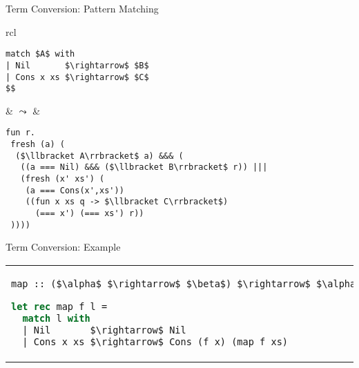 \documentclass{beamer}
\theoremstyle{definition}
\begin{document}
\begin{frame}[fragile]{Term Conversion: Pattern Matching}
  \begin{tabular}{rcl}
    \scalebox{3.5}{$\llbracket$}
    \begin{lstlisting}
match $A$ with
| Nil       $\rightarrow$ $B$
| Cons x xs $\rightarrow$ $C$
$$

    \end{lstlisting}
    \scalebox{3.5}{$\rrbracket$}
&
    $\leadsto$ & 
    \begin{lstlisting}
fun r.
 fresh (a) (
  ($\llbracket A\rrbracket$ a) &&& (
   ((a === Nil) &&& ($\llbracket B\rrbracket$ r)) ||| 
   (fresh (x' xs') (
    (a === Cons(x',xs'))
    ((fun x xs q -> $\llbracket C\rrbracket$) 
      (=== x') (=== xs') r))
 ))))
    \end{lstlisting}
    \end{tabular}
\end{frame}


\begin{comment}
\begin{frame}[fragile]\frametitle{Term Conversion: Pattern Matching}

    \begin{tabular}{l}
    \rule{0cm}{5mm}
    \begin{lstlisting}[mathescape=true,language=ocaml]
match l with
| Nil       $\rightarrow$ Nil
| Cons x xs $\rightarrow$ Cons (f x) (map f xs)


$\lambda$ res.
  fresh (res$_l$) (
    (l res$_l$) $\wedge$ (
      ((res$_l$ $\equiv$ Nil) $\wedge$ (Cnst$_{Nil}$ res)) $\vee$ 
      (fresh (res$_x$ res$_{xs}$) (
        (res$_l$ $\equiv$ Cons res$_x$ res$_{xs}$) $\wedge$
        (($\lambda$x. $\lambda$xs. Cnst$_{Cons}$) (($\equiv$) res$_x$) (($\equiv$) res$_{xs}$) res)))))
    \end{lstlisting}
    \end{tabular}
\end{frame}
\end{comment}
\begin{frame}[fragile]{Term Conversion: Example}
    \begin{center}
    \begin{tabular}{l}
    \begin{lstlisting}[mathescape=true,language=ocaml]
map :: ($\alpha$ $\rightarrow$ $\beta$) $\rightarrow$ $\alpha$ list $\rightarrow$ $\beta$ list

let rec map f l =
  match l with
  | Nil       $\rightarrow$ Nil 
  | Cons x xs $\rightarrow$ Cons (f x) (map f xs)    
    \end{lstlisting}
    \end{tabular}
    \end{center}
\end{frame}
\end{document}
